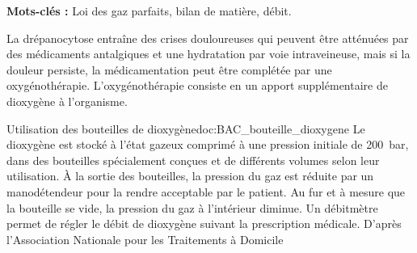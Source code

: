 


\newpage
{}

\textbf{Mots-clés :} Loi des gaz parfaits, bilan de matière, débit.
\medskip


La drépanocytose entraîne des crises douloureuses qui peuvent être atténuées par des médicaments antalgiques et une hydratation par voie intraveineuse, mais si la douleur persiste, la médicamentation peut être complétée par une oxygénothérapie.
L'oxygénothérapie consiste en un apport supplémentaire de dioxygène à l'organisme.

\begin{doc}{Utilisation des bouteilles de dioxygène}{doc:BAC_bouteille_dioxygene}
  Le dioxygène est stocké à l'état gazeux comprimé à une pression initiale de \qty{200}{\bar}, dans
  des bouteilles spécialement conçues et de différents volumes selon leur utilisation. À la
  sortie des bouteilles, la pression du gaz est réduite par un manodétendeur pour la rendre
  acceptable par le patient. Au fur et à mesure que la bouteille se vide, la pression du gaz à
  l'intérieur diminue.
  Un débitmètre permet de régler le débit de dioxygène suivant la prescription médicale.
  D'après l'Association Nationale pour les Traitements à Domicile
\end{doc}

